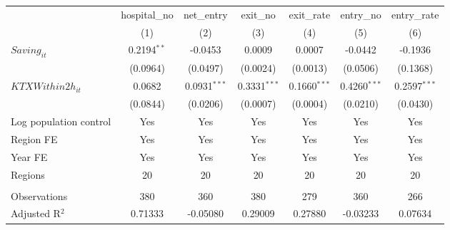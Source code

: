 \begingroup
\centering
\begin{tabular}{lcccccc}
   \toprule
                          & hospital\_no  & net\_entry     & exit\_no       & exit\_rate     & entry\_no      & entry\_rate \\    
                          & (1)           & (2)            & (3)            & (4)            & (5)            & (6)\\  
   \midrule 
   $Saving_{it}$          & 0.2194$^{**}$ & -0.0453        & 0.0009         & 0.0007         & -0.0442        & -0.1936\\   
                          & (0.0964)      & (0.0497)       & (0.0024)       & (0.0013)       & (0.0506)       & (0.1368)\\   
   $KTXWithin2h_{it}$     & 0.0682        & 0.0931$^{***}$ & 0.3331$^{***}$ & 0.1660$^{***}$ & 0.4260$^{***}$ & 0.2597$^{***}$\\   
                          & (0.0844)      & (0.0206)       & (0.0007)       & (0.0004)       & (0.0210)       & (0.0430)\\   
   Log population control & Yes           & Yes            & Yes            & Yes            & Yes            & Yes\\  
   Region FE              & Yes           & Yes            & Yes            & Yes            & Yes            & Yes\\  
   Year FE                & Yes           & Yes            & Yes            & Yes            & Yes            & Yes\\  
   Regions                & 20            & 20             & 20             & 20             & 20             & 20\\  
    \\
   Observations           & 380           & 360            & 380            & 279            & 360            & 266\\  
   Adjusted R$^2$         & 0.71333       & -0.05080       & 0.29009        & 0.27880        & -0.03233       & 0.07634\\  
   \bottomrule
\end{tabular}
\par\endgroup
